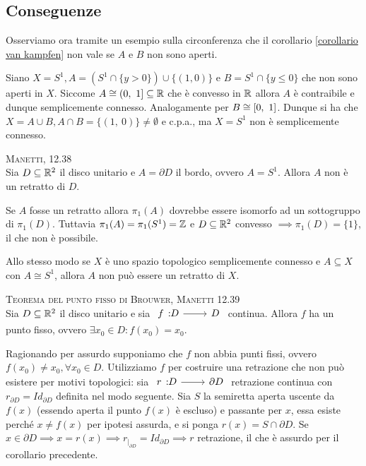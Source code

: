 	\subsection{Conseguenze}
Osserviamo ora tramite un esempio sulla circonferenza che il corollario \ref{corollario van kampfen} non vale se $A$ e $B$ non sono aperti.
\begin{observe}
	Siano $X=S^1, A=(S^1\cap\{y>0\})\cup \{(1,0)\}$ e $B=S^1\cap\{y\leq 0\}$ che non sono aperti in $X$. Siccome $A\cong (0,\ 1]\subseteq \mathbb{R}$ che è convesso in $\mathbb{R}$ allora $A$ è contraibile e dunque semplicemente connesso. Analogamente per $B\cong\left[0,\ 1\right]$. Dunque si ha che $X=A\cup B, A\cap B=\{(1,\ 0)\}\neq\emptyset$ e c.p.a., ma $X=S^1$ non è semplicemente connesso.
\end{observe}

\begin{corollary} \textsc{Manetti, 12.38} \label{circonferenza non retratto disco} \\
	Sia $D\subseteq\mathbb{R}^2$ il disco unitario e $A=\partial{D}$ il bordo, ovvero $A=S^1$. Allora $A$ non è un retratto di $D$.
\end{corollary}
\begin{demonstration}
	Se $A$ fosse un retratto allora $\pi_1(A)$ dovrebbe essere isomorfo ad un sottogruppo di $\pi_1(D)$. Tuttavia $\pi_1(A)=\pi_1(S^1)=\mathbb{Z}$ e $D\subseteq\mathbb{R}^2$ convesso $\implies \pi_1(D)=\{1\}$, il che non è possibile.
\end{demonstration}
\begin{observe}
	Allo stesso modo se $X$ è uno spazio topologico semplicemente connesso e $A\subseteq X$ con $A\cong S^1$, allora $A$ non può essere un retratto di $X$.
\end{observe}

\begin{corollary} \textsc{Teorema del punto fisso di Brouwer, Manetti 12.39} \label{punto fisso B}   \\
	Sia $D\subseteq \mathbb{R}^2$ il disco unitario e sia $\funz f D D$ continua. Allora $f$ ha un punto fisso, ovvero $\exists x_0\in D \colon f(x_0)=x_0$.
\end{corollary}
\begin{demonstration}
	Ragionando per assurdo supponiamo che $f$ non abbia punti fissi, ovvero $f(x_0)\neq x_0, \forall x_0\in D$. Utilizziamo $f$ per costruire una retrazione che non può esistere per motivi topologici: sia $\funz r D {\partial{D}}$ retrazione continua con $r_{\partial{D}}=Id_{\partial{D}}$ definita nel modo seguente. Sia $S$ la semiretta aperta uscente da $f(x)$ (essendo aperta il punto $f(x)$ è escluso) e passante per $x$, essa esiste perché $x\neq f(x)$ per ipotesi assurda, e si ponga $r(x)=S\cap\partial{D}$. Se $x\in\partial{D} \implies x=r(x) \implies r_{|_{\partial{D}}}= Id_{\partial{D}} \implies r$ retrazione, il che è assurdo per il corollario precedente.
\end{demonstration}

